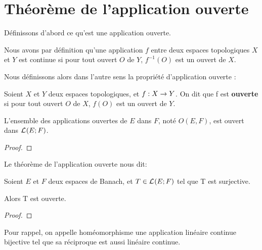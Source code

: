 \chapter{Théorème de l'application ouverte}

Définissons d'abord ce qu'est une application ouverte.

Nous avons par définition qu'une application $f$ entre deux espaces topologiques
$X$ et $Y$ est continue si pour tout ouvert $O$ de $Y$, $f^{-1}(O)$ est un
ouvert de $X$.

Nous définissons alors dans l'autre sens la propriété d'application ouverte :

\begin{definition} 
	Soient $X$ et $Y$ deux espaces topologiques, et $f : X \rightarrow Y$. On
	dit que f est \textbf{ouverte} si pour tout ouvert $O$ de $X$, $f(O)$ est un
	ouvert de $Y$.
\end{definition}


%

\begin{proposition}
	L'ensemble des applications ouvertes de $E$ dans $F$, noté $O(E, F)$, est
	ouvert dans $\mathcal{L}_{}(E; F)$.
\end{proposition}

\ifdefined\outputproof
\begin{proof}

\end{proof}
\fi

Le théorème de l'application ouverte nous dit:

\begin{theorem} 
\label{theorem_open_application}
	Soient $E$ et $F$ deux espaces de Banach, et $T \in \mathcal{L}_{}(E; F)$ tel
	que T est surjective.

	Alors T est ouverte.
\end{theorem}

\ifdefined\outputproof
\begin{proof}

\end{proof}
\fi

Pour rappel, on appelle homéomorphisme une application linéaire continue bijective
tel que sa réciproque est aussi linéaire continue.

